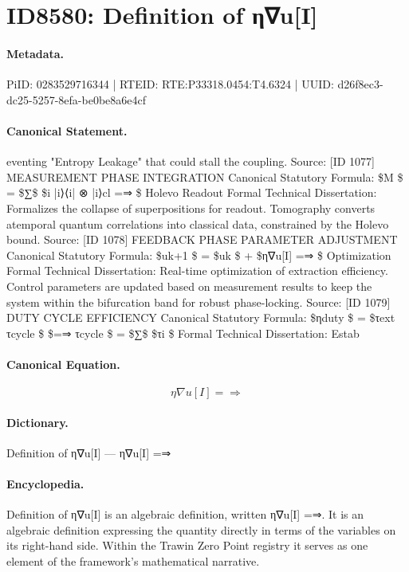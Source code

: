 \section*{ID8580: Definition of η∇u[I]}
\paragraph{Metadata.}
PiID: 0283529716344 | RTEID: RTE:P33318.0454:T4.6324 | UUID: d26f8ec3-dc25-5257-8efa-be0be8a6e4cf

\paragraph{Canonical Statement.}
eventing "Entropy Leakage" that could stall the coupling. Source: [ID 1077] MEASUREMENT PHASE INTEGRATION Canonical Statutory Formula: \$M \$ = \$∑\$ \$i |i⟩⟨i| ⊗ |i⟩cl =⇒ \$ Holevo Readout Formal Technical Dissertation: Formalizes the collapse of superpositions for readout. Tomography converts atemporal quantum correlations into classical data, constrained by the Holevo bound. Source: [ID 1078] FEEDBACK PHASE PARAMETER ADJUSTMENT Canonical Statutory Formula: \$uk+1 \$ = \$uk \$ + \$η∇u[I] =⇒ \$ Optimization Formal Technical Dissertation: Real-time optimization of extraction efficiency. Control parameters are updated based on measurement results to keep the system within the bifurcation band for robust phase-locking. Source: [ID 1079] DUTY CYCLE EFFICIENCY Canonical Statutory Formula: \$ηduty \$ = \$τext τcycle \$ \$=⇒ τcycle \$ = \$∑\$ \$τi \$ Formal Technical Dissertation: Estab

\paragraph{Canonical Equation.}
\[
η∇u[I] =⇒
\]

\paragraph{Dictionary.}
Definition of η∇u[I] — η∇u[I] =⇒

\paragraph{Encyclopedia.}
Definition of η∇u[I] is an algebraic definition, written η∇u[I] =⇒. It is an algebraic definition expressing the quantity directly in terms of the variables on its right-hand side. Within the Trawin Zero Point registry it serves as one element of the framework's mathematical narrative.
